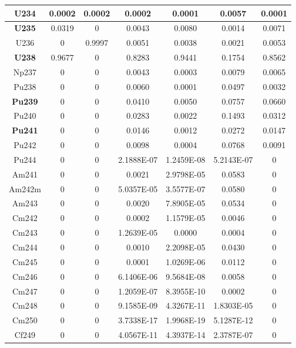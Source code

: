 \begin{table}[h]
{\begin{tabular}{|c|c|c|c|c|c|c|}
			  U234	 & 	0.0002& 	0.0002 & 	0.0002 & 	0.0001 & 	0.0057 & 	0.0001 \\ \hline 
			  \textbf{U235}	 & 	0.0319& 	0 & 	0.0043 & 	0.0080 & 	0.0014 & 	0.0071 \\ \hline 
			  U236	 & 	0& 	0.9997 & 	0.0051 & 	0.0038 & 	0.0021 & 	0.0053 \\ \hline 
			  \textbf{U238}	 & 	0.9677& 	0 & 	0.8283 & 	0.9441 & 	0.1754 & 	0.8562 \\ \hline 
			  Np237	 & 	0& 	0 & 	0.0043 & 	0.0003 & 	0.0079 & 	0.0065 \\ \hline 
			  Pu238	 & 	0& 	0 & 	0.0060 & 	0.0001 & 	0.0497 & 	0.0032 \\ \hline 
			  \textbf{Pu239}	 & 	0& 	0 & 	0.0410 & 	0.0050 & 	0.0757 & 	0.0660 \\ \hline 
			  Pu240	 & 	0& 	0 & 	0.0283 & 	0.0022 & 	0.1493 & 	0.0312 \\ \hline 
			  \textbf{Pu241}	 & 	0& 	0 & 	0.0146 & 	0.0012 & 	0.0272 & 	0.0147 \\ \hline 
			  Pu242	 & 	0& 	0 & 	0.0098 & 	0.0004 & 	0.0768 & 	0.0091 \\ \hline 
			  Pu244	 & 	0& 	0 & 	2.1888E-07 & 	1.2459E-08 & 	5.2143E-07 & 	0 \\ \hline 
			  Am241	 & 	0& 	0 & 	0.0021 & 	2.9798E-05 & 	0.0583 & 	0 \\ \hline 
			  Am242m	 & 	0& 	0 & 	5.0357E-05 & 	3.5577E-07 & 	0.0580 & 	0 \\ \hline 
			  Am243	 & 	0& 	0 & 	0.0020 & 	7.8905E-05 & 	0.0534 & 	0 \\ \hline 
			  Cm242	 & 	0& 	0 & 	0.0002 & 	1.1579E-05 & 	0.0046 & 	0 \\ \hline 
			  Cm243	 & 	0& 	0 & 	1.2639E-05 & 	0.0000 & 	0.0004 & 	0 \\ \hline 
			  Cm244	 & 	0& 	0 & 	0.0010 & 	2.2098E-05 & 	0.0430 & 	0 \\ \hline 
			  Cm245	 & 	0& 	0 & 	0.0001 & 	1.0269E-06 & 	0.0112 & 	0 \\ \hline 
			  Cm246	 & 	0& 	0 & 	6.1406E-06 & 	9.5684E-08 & 	0.0058 & 	0 \\ \hline 
			  Cm247	 & 	0& 	0 & 	1.2059E-07 & 	8.3955E-10 & 	0.0002 & 	0 \\ \hline 
			  Cm248	 & 	0& 	0 & 	9.1585E-09 & 	4.3267E-11 & 	1.8303E-05 & 	0 \\ \hline 
			  Cm250	 & 	0& 	0 & 	3.7338E-17 & 	1.9968E-19 & 	5.1287E-12 & 	0 \\ \hline 
			  Cf249	 & 	0& 	0 & 	4.0567E-11 & 	4.3937E-14 & 	2.3787E-07 & 	0 \\ \hline 

\end{tabular}}
\end{table}
